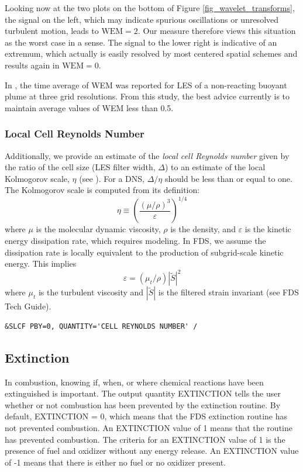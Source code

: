 \documentclass[11pt]{book}
\begin{document}
Looking now at the two plots on the bottom of Figure \ref{fig_wavelet_transforms}, the signal on the left, which may indicate spurious oscillations or unresolved turbulent motion, leads to $\mbox{WEM} = 2$.  Our measure therefore views this situation as the worst case in a sense.  The signal to the lower right is indicative of an extremum, which actually is easily resolved by most centered spatial schemes and results again in $\mbox{WEM}=0$.

In \cite{McDermott:2010}, the time average of WEM was reported for LES of a non-reacting buoyant plume at three grid resolutions.  From this study, the best advice currently is to maintain average values of WEM less than 0.5.

\subsubsection{Local Cell Reynolds Number}

Additionally, we provide an estimate of the \emph{local cell Reynolds number} given by the ratio of the cell size (LES filter width, $\Delta$) to an estimate of the local Kolmogorov scale, $\eta$ (see \cite{Pope:2000}).  For a DNS, $\Delta/\eta$ should be less than or equal to one. The Kolmogorov scale is computed from its definition:
\begin{equation}
\eta \equiv \left(\frac{(\mu/\rho)^3}{\varepsilon}\right)^{1/4}
\end{equation}
where $\mu$ is the molecular dynamic viscosity, $\rho$ is the density, and $\varepsilon$ is the kinetic energy dissipation rate, which requires modeling.  In FDS, we assume the dissipation rate is locally equivalent to the production of subgrid-scale kinetic energy.  This implies
\begin{equation}
\varepsilon = (\mu_t/\rho)|\tilde{S}|^2
\end{equation}
where $\mu_t$ is the turbulent viscosity and $|\tilde{S}|$ is the filtered strain invariant (see FDS Tech Guide).

\begin{lstlisting}
&SLCF PBY=0, QUANTITY='CELL REYNOLDS NUMBER' /
\end{lstlisting}

\subsection{Extinction}
\label{info:extinct_out}
In combustion, knowing if, when, or where chemical reactions have been extinguished is important. The output quantity {\ct EXTINCTION} tells the user whether or not combustion has been prevented by the extinction routine. By default, {\ct EXTINCTION} = 0, which means that the FDS extinction routine has not prevented combustion. An {\ct EXTINCTION} value of 1 means that the routine has prevented combustion. The criteria for an {\ct EXTINCTION} value of 1 is the presence of fuel and oxidizer without any energy release. An {\ct EXTINCTION} value of -1 means that there is either no fuel or no oxidizer present.
\end{document}
